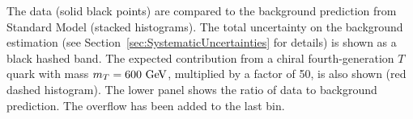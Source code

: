         The data (solid black points) are compared to the background 
        prediction from Standard Model (stacked histograms). 
        The total uncertainty on the background estimation (see Section~\ref{sec:SystematicUncertainties} for details) is shown as a black hashed band.
        The expected contribution from a chiral fourth-generation $T$ quark 
        with mass $m_{\T}=600\gev$, multiplied by a factor of 50, 
        is also shown (red dashed histogram).
        The lower panel shows the ratio of data to background prediction. 
        The overflow has been added to the last bin.
